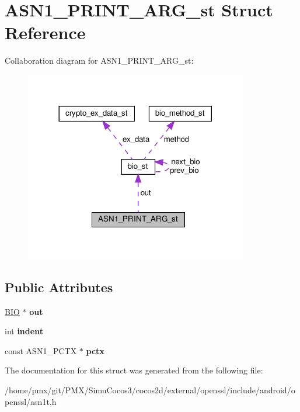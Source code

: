 \hypertarget{structASN1__PRINT__ARG__st}{}\section{A\+S\+N1\+\_\+\+P\+R\+I\+N\+T\+\_\+\+A\+R\+G\+\_\+st Struct Reference}
\label{structASN1__PRINT__ARG__st}


Collaboration diagram for A\+S\+N1\+\_\+\+P\+R\+I\+N\+T\+\_\+\+A\+R\+G\+\_\+st\+:
\nopagebreak
\begin{figure}[H]
\begin{center}
\leavevmode
\includegraphics[width=276pt]{structASN1__PRINT__ARG__st__coll__graph}
\end{center}
\end{figure}
\subsection*{Public Attributes}
\begin{DoxyCompactItemize}
\item 
\mbox{\label{structASN1__PRINT__ARG__st_a77073d97560a9aa34978b5eef0f8a2d1}} 
\hyperlink{structbio__st}{B\+IO} $\ast$ {\bfseries out}
\item 
\mbox{\label{structASN1__PRINT__ARG__st_a62f3360ea4704ea92e62e0a4c28d238f}} 
int {\bfseries indent}
\item 
\mbox{\label{structASN1__PRINT__ARG__st_a71fc3a50b70a0c2e925a4b017d8f4019}} 
const A\+S\+N1\+\_\+\+P\+C\+TX $\ast$ {\bfseries pctx}
\end{DoxyCompactItemize}


The documentation for this struct was generated from the following file\+:\begin{DoxyCompactItemize}
\item 
/home/pmx/git/\+P\+M\+X/\+Simu\+Cocos3/cocos2d/external/openssl/include/android/openssl/asn1t.\+h\end{DoxyCompactItemize}
